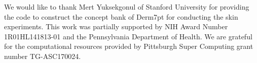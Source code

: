 We would like to thank Mert Yuksekgonul of Stanford University for providing the code to construct the concept bank of Derm7pt for conducting the skin experiments. This work was partially supported by NIH Award Number 1R01HL141813-01 and the Pennsylvania Department of Health. We are grateful for the computational resources provided by Pittsburgh Super Computing grant number TG-ASC170024.

